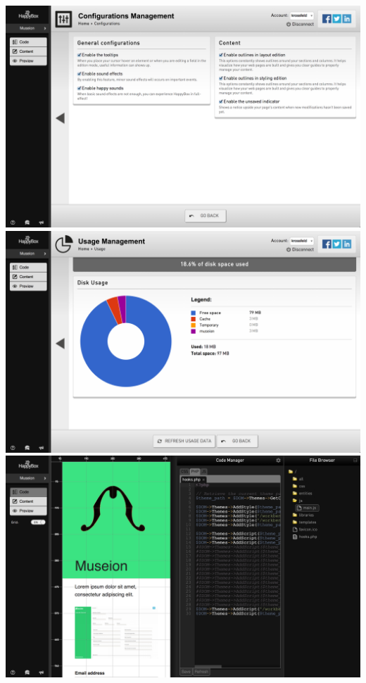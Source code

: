 \documentclass[11pt, a4paper ]{article}
\begin{document}
\begin{spacing}{1.5}
	\includegraphics[width=\textwidth]{images/HBscreen/5}
	\includegraphics[width=\textwidth]{images/HBscreen/6}
	\includegraphics[width=\textwidth]{images/HBscreen/7}

\end{spacing}
\end{document}
